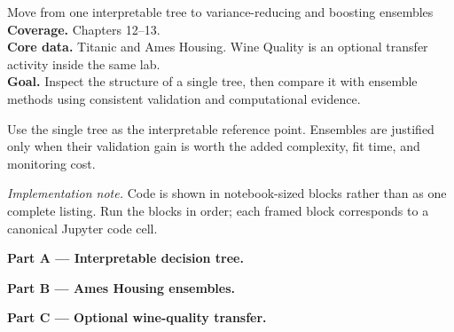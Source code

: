 
\begin{labproject}{Move from one interpretable tree to variance-reducing and boosting ensembles}
\textbf{Coverage.} Chapters 12--13.\\
\textbf{Core data.} Titanic and Ames Housing. Wine Quality is an optional transfer activity inside the same lab.\\
\textbf{Goal.} Inspect the structure of a single tree, then compare it with ensemble methods using consistent validation and computational evidence.

\begin{labmode}
Use the single tree as the interpretable reference point. Ensembles are justified only when their validation gain is worth the added complexity, fit time, and monitoring cost.
\end{labmode}

\smallskip\noindent\textit{Implementation note.} Code is shown in notebook-sized blocks rather than as one complete listing. Run the blocks in order; each framed block corresponds to a canonical Jupyter code cell.\par

\medskip\noindent\textbf{Part A --- Interpretable decision tree.}\par







\medskip\noindent\textbf{Part B --- Ames Housing ensembles.}\par





\medskip\noindent\textbf{Part C --- Optional wine-quality transfer.}\par





\end{labproject}

